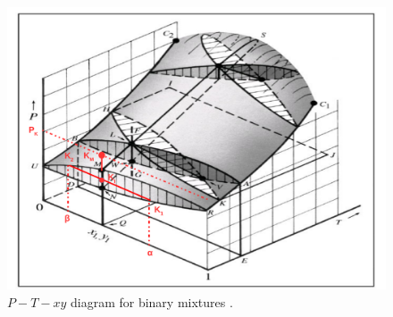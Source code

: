       \begin{figure}[h] 
         \begin{center}
             \includegraphics[width=.75\columnwidth,clip]{./Figs/PTxy_Digram} 
             \vspace{-.1cm}\caption{$P-T-xy$ diagram for binary mixtures \citep[extracted from][]{SmithVanNess_Book}.}\label{Chapter:VLE:Fig:Fig02}
         \end{center}
       \end{figure}

